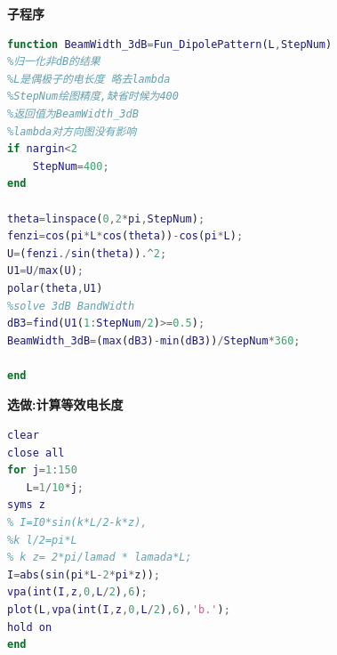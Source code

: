 \noindent \textbf{子程序}
\begin{lstlisting}[language={matlab},keywordstyle=\color{blue!70},commentstyle=\color{red!50!green!50!blue!50},frame=shadowbox, rulesepcolor=\color{red!20!green!20!blue!20}] 
function BeamWidth_3dB=Fun_DipolePattern(L,StepNum)
%归一化非dB的结果
%L是偶极子的电长度 略去lambda
%StepNum绘图精度,缺省时候为400
%返回值为BeamWidth_3dB
%lambda对方向图没有影响
if nargin<2
    StepNum=400;
end
    
theta=linspace(0,2*pi,StepNum);
fenzi=cos(pi*L*cos(theta))-cos(pi*L);
U=(fenzi./sin(theta)).^2;
U1=U/max(U);
polar(theta,U1)
%solve 3dB BandWidth
dB3=find(U1(1:StepNum/2)>=0.5);
BeamWidth_3dB=(max(dB3)-min(dB3))/StepNum*360;

end
\end{lstlisting}
\noindent \textbf{选做:计算等效电长度}
\begin{lstlisting}[language={matlab},keywordstyle=\color{blue!70},commentstyle=\color{red!50!green!50!blue!50},frame=shadowbox, rulesepcolor=\color{red!20!green!20!blue!20}] 
%计算电长度
clear
close all
for j=1:150
   L=1/10*j;
syms z
% I=I0*sin(k*L/2-k*z), 
%k l/2=pi*L 
% k z= 2*pi/lamad * lamada*L;
I=abs(sin(pi*L-2*pi*z));
vpa(int(I,z,0,L/2),6);
plot(L,vpa(int(I,z,0,L/2),6),'b.');
hold on
end

\end{lstlisting}
